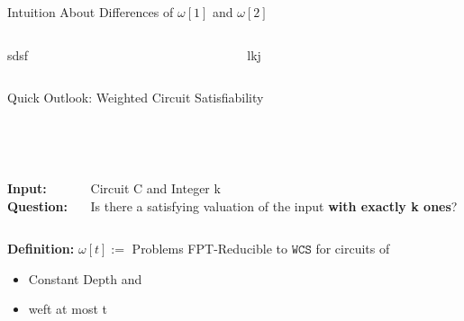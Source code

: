 \begin{frame}{Intuition About Differences of $\omega[1]$ and $\omega[2]$}
\begin{columns}[T] %
    \begin{column}{.5\textwidth}
    sdsf
    \end{column}
    \begin{column}{.5\textwidth}
    lkj
    \end{column}
\end{columns}

\end{frame}

\begin{frame}{Quick Outlook: Weighted Circuit Satisfiability}

\begin{tcolorbox}[colback=green!5,colframe=green!40!black,title=$\mathtt{WEIGHTED~CIRCUIT~SATISFIABILITY (WCS)}$ (\cite{Cygan2015})]
\begin{columns}[T] %
    \begin{column}{.18\textwidth}
    \\~
    
    \textbf{Input:}\\
    \textbf{Question:}
    \end{column}
    \begin{column}{.78\textwidth}
    \\~
    
    Circuit C and Integer k\\
    
    Is there a satisfying valuation of the input \textbf{with exactly k ones}?
    
    \end{column}
 \end{columns}

\end{tcolorbox}


\textbf{Definition: } $\omega[t] := $ Problems FPT-Reducible to $\mathtt{WCS}$ for circuits of 
\begin{itemize}
    \item Constant Depth and
    \item weft at most t
\end{itemize}

\end{frame}


